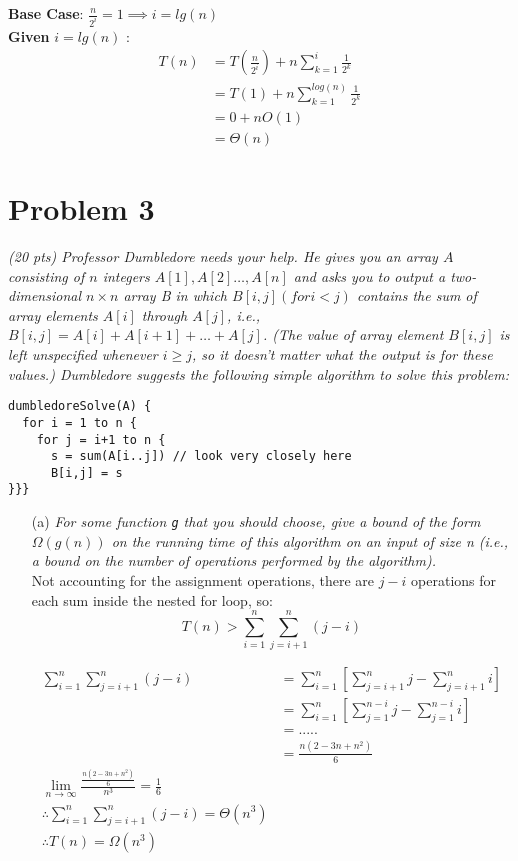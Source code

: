 \documentclass[12pt]{article} \setlength{\oddsidemargin}{0in}
\newcommand\lmni{\lim_{n\to\infty}}
\begin{document}
{\begin{enumerate}
  \textbf{Base Case}: $\frac{n}{2^i} = 1 \implies i=lg(n)$ \\
  \medskip
  \textbf{Given} $i = lg(n)$ : \\
  \begin{align}
  T(n) &= T(\frac{n}{2^i}) + n\sum_{k=1}^{i} \frac{1}{2^k} \\
  &= T(1) + n\sum_{k=1}^{log(n)} \frac{1}{2^k}\\
  &= 0 + nO(1) \\
  &= \Theta(n)
  \end{align}

\end{enumerate}

\newpage

\section*{Problem 3}

\textit{(20 pts) Professor Dumbledore needs your help. He gives you an
  array $A$ consisting of $n$ integers $A[1],A[2]\dots,A[n]$ and asks
  you to output a two-dimensional $n \times n$ array B in which
  $B[i, j] (for i < j)$ contains the sum of array elements $A[i]$
  through $A[j]$, i.e., $B[i, j] = A[i] + A[i + 1] + \dots +
  A[j]$. (The value of array element $B[i, j]$ is left unspecified
  whenever $i \ge j$, so it doesn't matter what the output is for these
  values.) Dumbledore suggests the following simple algorithm to solve
  this problem:}

\begin{verbatim}
dumbledoreSolve(A) {
  for i = 1 to n {
    for j = i+1 to n {
      s = sum(A[i..j]) // look very closely here
      B[i,j] = s
}}}
\end{verbatim}

\begin{enumerate}
\item[(a)]{\textit{For some function \texttt{g} that you should choose, give a
    bound of the form $\Omega(g(n))$ on the running time of this algorithm
    on an input of size n (i.e., a bound on the number of operations
    performed by the algorithm).}} \\

  Not accounting for the assignment operations, there are $j-i$ operations for each sum inside the nested for loop, so: 
  $$T(n) > \sum_{i=1}^{n}\sum_{j=i+1}^{n} (j-i)$$

  \begin{align}
  \sum_{i=1}^{n}\sum_{j=i+1}^{n} (j-i) &= \sum_{i=1}^{n}[\sum_{j=i+1}^{n} j - \sum_{j=i+1}^{n} i] \\
  &= \sum_{i=1}^{n}[\sum_{j=1}^{n-i} j - \sum_{j=1}^{n-i} i] \\ 
  &= ..... \\
  &= \frac{n(2 - 3 n + n^2)}{6} \\
  \lmni \frac{\frac{n(2 - 3 n + n^2)}{6}}{n^3} = \frac{1}{6} \\
  \therefore \sum_{i=1}^{n}\sum_{j=i+1}^{n} (j-i) = \Theta(n^3) \\
  \therefore T(n) = \Omega(n^3)
  \end{align}


\end{enumerate}}
\end{document}
